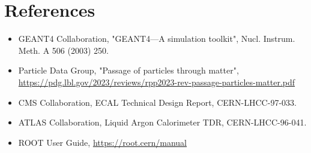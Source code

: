 \documentclass[11pt]{article}
\begin{document}
\section{References}
\begin{itemize}
  \item \label{geant4_manual}GEANT4 Collaboration, "GEANT4—A simulation toolkit", Nucl. Instrum. Meth. A 506 (2003) 250.
  \item \label{pdg_calorimetry}Particle Data Group, "Passage of particles through matter", \url{https://pdg.lbl.gov/2023/reviews/rpp2023-rev-passage-particles-matter.pdf}
  \item \label{cms_ecal_tdr}CMS Collaboration, ECAL Technical Design Report, CERN-LHCC-97-033.
  \item \label{atlas_lar_tdr}ATLAS Collaboration, Liquid Argon Calorimeter TDR, CERN-LHCC-96-041.
  \item \label{root_docs}ROOT User Guide, \url{https://root.cern/manual}
\end{itemize}
\end{document}

